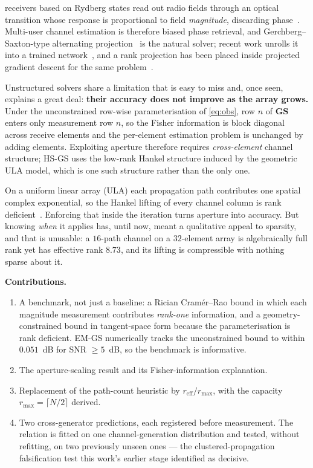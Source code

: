 \documentclass[journal]{IEEEtran}
\newcommand{\bG}{\mathbf{G}}
\newcommand{\bS}{\mathbf{S}}
\newcommand{\reff}{r_{\mathrm{eff}}}
\newcommand{\rmax}{r_{\max}}
\begin{document}
 receivers based on Rydberg states read out radio fields
through an optical transition whose response is proportional to field
\emph{magnitude}, discarding phase~\cite{cui2025,gong2025mag}. Multi-user
channel estimation is therefore biased phase retrieval, and
Gerchberg--Saxton-type alternating projection~\cite{gerchberg1972} is the
natural solver; recent work unrolls it into a trained
network~\cite{xiao2026}, and a rank projection has been placed inside
projected gradient descent for the same problem~\cite{xu2025}.

Unstructured solvers share a limitation that is easy to miss and, once seen,
explains a great deal: \textbf{their accuracy does not improve as the array
grows.} Under the unconstrained row-wise parameterisation of \eqref{eq:obs},
row $n$ of $\bG\bS$ enters only measurement row $n$, so the Fisher information
is block diagonal across receive elements and the per-element estimation
problem is unchanged by adding elements. Exploiting aperture therefore requires
\emph{cross-element} channel structure; HS-GS uses the low-rank Hankel
structure induced by the geometric ULA model, which is one such structure
rather than the only one.

On a uniform linear array (ULA) each propagation path contributes one spatial
complex exponential, so the Hankel lifting of every channel column is rank
deficient~\cite{cadzow1988,markovsky2008}. Enforcing that inside the iteration
turns aperture into accuracy. But knowing \emph{when} it applies has, until
now, meant a qualitative appeal to sparsity, and that is unusable: a $16$-path
channel on a $32$-element array is algebraically full rank yet has effective
rank $8.73$, and its lifting is compressible with nothing sparse about it.

\textbf{Contributions.}
\begin{enumerate}
\item A benchmark, not just a baseline: a Rician Cram\'er--Rao bound in which
each magnitude measurement contributes \emph{rank-one} information, and a
geometry-constrained bound in tangent-space form because the parameterisation
is rank deficient. EM-GS numerically tracks the unconstrained bound to within
$0.051$~dB for SNR $\ge 5$~dB, so the benchmark is informative.
\item The aperture-scaling result and its Fisher-information explanation.
\item Replacement of the path-count heuristic by $\reff/\rmax$, with the
capacity $\rmax=\lceil N/2\rceil$ derived.
\item Two cross-generator predictions, each registered before measurement.
The relation is fitted on one channel-generation distribution and tested,
without refitting, on two previously unseen ones --- the clustered-propagation
falsification test this work's earlier stage identified as decisive.
\end{enumerate}
\end{document}
